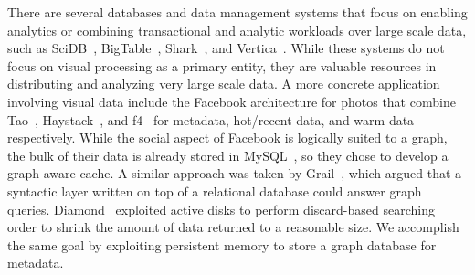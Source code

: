 There are several databases and data management systems that focus on enabling
analytics or combining transactional and analytic workloads over large
scale data, such as SciDB~\cite{brown2010overview},
BigTable~\cite{chang2008bigtable}, Shark~\cite{xin2013shark},
and Vertica~\cite{lamb2012vertica}.
While these systems do not focus on visual processing as a primary entity,
they are valuable resources in distributing and analyzing very large scale data.
A more concrete application involving visual data include
the Facebook architecture for photos that combine Tao~\cite{tao},
Haystack~\cite{beaver2010finding}, and f4~\cite{muralidhar2014f4} for metadata,
hot/recent data, and warm data respectively.
While the social aspect of Facebook is logically suited to a graph,
the bulk of their data is already stored in MySQL~\cite{mysql},
so they chose to develop a graph-aware cache.
A similar approach was taken by Grail~\cite{fan2015case},
which argued that a syntactic layer written on top of a relational database
could answer graph queries.
Diamond~\cite{huston2004diamond,satyanarayanan2010unique} exploited active
disks to perform discard-based searching order to shrink the amount of data
returned to a reasonable size.
We accomplish the same goal by exploiting persistent memory to store a
graph database for metadata.
